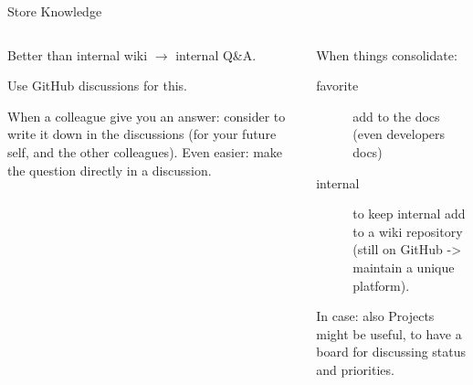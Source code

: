 \documentclass[9pt]{beamer}
\begin{document}
\begin{frame}{Store Knowledge}
    \begin{columns}
        \begin{column}{0.5\textwidth}
            Better than internal wiki $\to$ internal Q\&A.

            Use GitHub discussions for this.

            When a colleague give you an answer: consider to write it down in
            the discussions (for your future self, and the other colleagues).
            Even easier: make the question directly in a discussion.
        \end{column}
        \begin{column}{0.5\textwidth}
            When things consolidate:

            \begin{description}
                \item[ favorite] add to the docs (even developers docs)
                \item[internal] to keep internal add to a wiki repository
                  (still on GitHub -> maintain a unique platform).
            \end{description}

            In case: also Projects might be useful, to have a board for
            discussing status and priorities.
        \end{column}
    \end{columns}
\end{frame}
\end{document}

